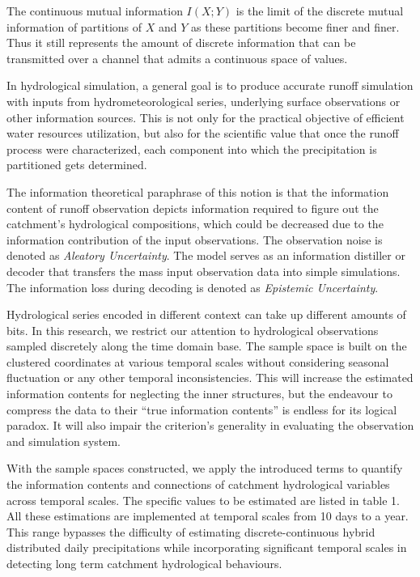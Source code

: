 \documentclass[11pt]{article}
\begin{document}
The continuous mutual information $I(X;Y)$ is the limit of the discrete mutual information of partitions of $X$ and $Y$ as these partitions become finer and finer. Thus it  still represents the amount of discrete information that can be transmitted over a channel that admits a continuous space of values.

In hydrological simulation, a general goal is to produce accurate runoff simulation with inputs from hydrometeorological series, underlying surface observations or other information sources. This is not only for the practical objective of efficient water resources utilization, but also for the scientific value that once the runoff process were characterized, each component into which the precipitation is partitioned gets determined. 

The information theoretical paraphrase of this notion is that the information content of runoff observation depicts information required to figure out the catchment's hydrological compositions, which could be decreased due to the information contribution of the input observations. The observation noise is denoted as \emph{Aleatory Uncertainty}. The model serves as an information distiller or decoder that transfers the mass input observation data into simple simulations. The information loss during decoding is denoted as \emph{Epistemic Uncertainty}.

Hydrological series encoded in different context can take up different amounts of bits. In this research, we restrict our attention to hydrological observations sampled discretely along the time domain base. The sample space is built on the clustered coordinates at various temporal scales without considering seasonal fluctuation or any other temporal inconsistencies. This will increase the estimated information contents for neglecting the inner structures, but the endeavour to compress the data to their ``true information contents'' is endless for its logical paradox\cite{li2009introduction}. It will also impair the criterion's generality in evaluating the observation and simulation system.  

 


With the sample spaces constructed,
we apply the introduced terms to quantify the information contents and connections of catchment hydrological variables across temporal scales. The specific values to be estimated are listed in table 1. All these estimations are implemented at temporal scales from 10 days to a year. This range  bypasses the difficulty of estimating discrete-continuous hybrid distributed daily precipitations\cite{gong2014estimating} while incorporating significant temporal scales in detecting long term catchment hydrological behaviours. 
\end{document}
